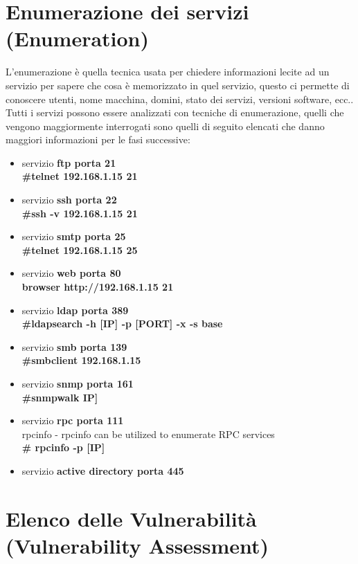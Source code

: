 \documentclass[a4paper,12pt]{article}
\begin{document}
\section{ Enumerazione  dei servizi (Enumeration)}

L'enumerazione è quella tecnica usata per chiedere informazioni lecite ad un servizio per sapere che cosa è memorizzato in quel servizio, questo ci permette di conoscere utenti,  nome macchina, domini, stato dei servizi, versioni software, ecc.. \\
Tutti i servizi possono essere analizzati con tecniche di enumerazione, quelli che vengono maggiormente interrogati sono quelli di seguito elencati che danno maggiori informazioni per le fasi successive:
\begin{itemize}

    \item servizio\textbf{ ftp porta 21} \\
        \textbf{ \#telnet  192.168.1.15 21}
    \item servizio \textbf{ssh porta 22} \\
        \textbf{ \#ssh -v 192.168.1.15 21}
    \item servizio \textbf{smtp porta 25} \\
        \textbf{ \#telnet  192.168.1.15 25}
     \item servizio \textbf{web porta 80} \\
        \textbf{ browser http://192.168.1.15 21}
    \item servizio \textbf{ldap porta 389} \\
        \textbf{ \#ldapsearch -h [IP] -p [PORT] -x -s base}
    \item servizio\textbf{ smb porta 139} \\
        \textbf{ \#smbclient 192.168.1.15}
    \item servizio\textbf{ snmp porta 161} \\
         \textbf{ \#snmpwalk IP]}
     \item servizio\textbf{ rpc porta 111} \\
        rpcinfo - rpcinfo can be utilized to enumerate RPC services \\
        \textbf{ \# rpcinfo -p [IP]}
    \item servizio\textbf{ active directory porta 445}
\end{itemize}

\section{ Elenco delle Vulnerabilità (Vulnerability Assessment) }
\end{document}
